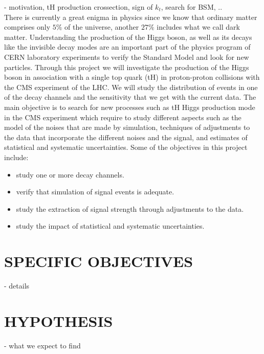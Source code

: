 \documentclass[final,3p]{CSP}
\begin{document}
- motivation, tH production crossection, sign of $k_t$, search for BSM, ..\\

There is currently a great enigma in physics since we know that ordinary matter comprises 
only $5\%$ of the universe, another 
$27\%$ includes what we call dark matter. Understanding the production of the Higgs boson, as 
well as its decays like the invisible decay modes are an important part of the physics 
program of CERN laboratory experiments to verify the Standard Model and look for new 
particles. Through this project we will investigate the production of the Higgs boson in 
association with a single top quark (tH) in proton-proton collisions with the CMS experiment 
of the LHC. We will study the distribution of events in one of the decay channels and the 
sensitivity that we get with the current data. The main objective is to search for new 
processes such as tH Higgs production mode in the CMS experiment which require to study 
different aspects such as the model of the noises that are made by simulation, techniques of 
adjustments to the data that incorporate the different noises and the signal, and estimates 
of statistical and systematic uncertainties.
Some of the objectives in this project include:\\
\begin{itemize}
\item study one or more decay channels.\\
\item verify that simulation of signal events is adequate.\\
\item study the extraction of signal strength through adjustments to the data.\\
\item study the impact of statistical and systematic uncertainties.\\
\end{itemize}

\section{SPECIFIC OBJECTIVES}
- details 

\section{HYPOTHESIS}
- what we expect to find\\
\end{document}
